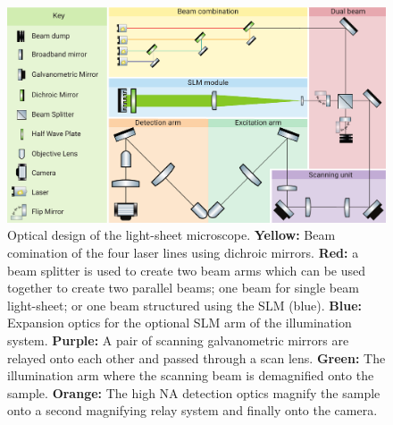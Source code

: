\begin{landscape}
  \begin{figure}
  \centering
  \includegraphics[width=\linewidth]{./optical_design_colour}
  \caption[Full optical design of new SPIM]{
  Optical design of the light-sheet microscope. \textbf{Yellow:} Beam comination of the four laser lines using dichroic mirrors.
  \textbf{Red:} a beam splitter is used to create two beam arms which can be used together to create two parallel beams; one beam for single beam light-sheet; or one beam structured using the SLM (blue).
  \textbf{Blue:} Expansion optics for the optional SLM arm of the illumination system.
  \textbf{Purple:} A pair of scanning galvanometric mirrors are relayed onto each other and passed through a scan lens.
  \textbf{Green:} The illumination arm where the scanning beam is demagnified onto the sample.
  \textbf{Orange:} The high NA detection optics magnify the sample onto a second magnifying relay system and finally onto the camera.
  }\label{fig:optical_design_colour}
  \end{figure}
\end{landscape}



